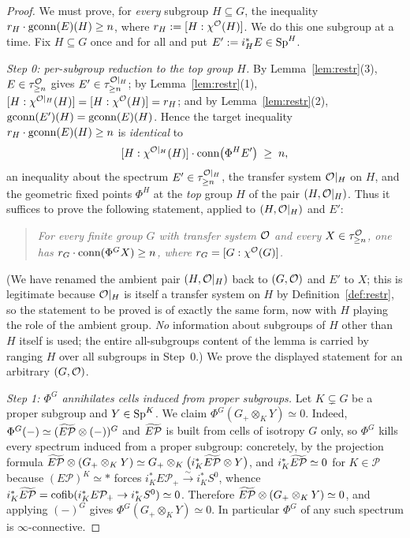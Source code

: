 \begin{proof}
We must prove, for \emph{every} subgroup $H\subseteq G$, the inequality
$r_H\cdot\operatorname{gconn}(E)(H)\ge n$, where $r_H:=[H:\chi^{\mathcal{O}}(H)]$. We do this one
subgroup at a time. Fix $H\subseteq G$ once and for all and put
$E':=i_H^\ast E\in\mathrm{Sp}^H$.

\emph{Step 0: per-subgroup reduction to the top group $H$.}
By Lemma~\ref{lem:restr}(3), $E\in\tau^{\mathcal{O}}_{\ge n}$ gives
$E'\in\tau^{\mathcal{O}|_H}_{\ge n}$; by Lemma~\ref{lem:restr}(1),
$[H:\chi^{\mathcal{O}|_H}(H)]=[H:\chi^{\mathcal{O}}(H)]=r_H$; and by
Lemma~\ref{lem:restr}(2), $\operatorname{gconn}(E')(H)=\operatorname{gconn}(E)(H)$. Hence the target
inequality $r_H\cdot\operatorname{gconn}(E)(H)\ge n$ is \emph{identical} to
\begin{equation}\label{eq:fwd-top}
[H:\chi^{\mathcal{O}|_H}(H)]\cdot\operatorname{conn}\bigl(\Phi^H E'\bigr)\;\ge\;n ,
\end{equation}
an inequality about the spectrum $E'\in\tau^{\mathcal{O}|_H}_{\ge n}$, the transfer
system $\mathcal{O}|_H$ on $H$, and the geometric fixed points $\Phi^H$ at the
\emph{top} group $H$ of the pair $(H,\mathcal{O}|_H)$. Thus it suffices to prove the
following statement, applied to $(H,\mathcal{O}|_H)$ and $E'$:

\begin{quote}\emph{For every finite group $G$ with transfer system $\mathcal{O}$ and
every $X\in\tau^{\mathcal{O}}_{\ge n}$, one has
$r_G\cdot\operatorname{conn}(\Phi^G X)\ge n$, where $r_G=[G:\chi^{\mathcal{O}}(G)]$.}\end{quote}

(We have renamed the ambient pair $(H,\mathcal{O}|_H)$ back to $(G,\mathcal{O})$ and $E'$ to
$X$; this is legitimate because $\mathcal{O}|_H$ is itself a transfer system on $H$ by
Definition~\ref{def:restr}, so the statement to be proved is of exactly the same
form, now with $H$ playing the role of the ambient group. \emph{No} information
about subgroups of $H$ other than $H$ itself is used; the entire all-subgroups
content of the lemma is carried by ranging $H$ over all subgroups in Step~0.)
We prove the displayed statement for an arbitrary $(G,\mathcal{O})$.

\emph{Step 1: $\Phi^G$ annihilates cells induced from proper subgroups.}
Let $K\subsetneq G$ be a proper subgroup and $Y\in\mathrm{Sp}^K$. We claim
$\Phi^G(G_+\otimes_K Y)\simeq 0$. Indeed, $\Phi^G(-)\simeq(\widetilde{E\mathcal P}\otimes(-))^G$
and $\widetilde{E\mathcal P}$ is built from cells of isotropy $G$ only, so $\Phi^G$ kills every
spectrum induced from a proper subgroup: concretely, by the projection formula
$\widetilde{E\mathcal P}\otimes(G_+\otimes_K Y)\simeq G_+\otimes_K\bigl(i_K^\ast\widetilde{E\mathcal P}\otimes Y\bigr)$,
and $i_K^\ast\widetilde{E\mathcal P}\simeq 0$ for $K\in\mathcal P$ because
$(E\mathcal P)^K\simeq\ast$ forces $i_K^\ast E\mathcal P_+\xrightarrow{\sim} i_K^\ast S^0$,
whence $i_K^\ast\widetilde{E\mathcal P}=\operatorname{cofib}(i_K^\ast E\mathcal P_+\to i_K^\ast S^0)\simeq 0$.
Therefore $\widetilde{E\mathcal P}\otimes(G_+\otimes_K Y)\simeq 0$, and applying $(-)^G$ gives
$\Phi^G(G_+\otimes_K Y)\simeq 0$. In particular $\Phi^G$ of any such spectrum is
$\infty$-connective.


\end{proof}
